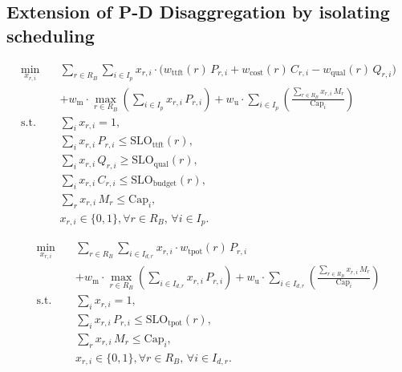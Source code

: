 \documentclass[letterpaper, anonymous, twocolumn, 10pt]{article}
\begin{document}
{\subsection{Extension of P-D Disaggregation by isolating scheduling}

\begin{equation}
\begin{aligned}
\min_{x_{r,i}} \quad 
& \sum_{r\in R_B}\sum_{i\in I_{p}} x_{r,i} \cdot \Big(w_{\text{ttft}}(r) \, P_{r,i} + w_{\text{cost}}(r) \, C_{r,i} - w_{\text{qual}}(r) \, Q_{r,i} \Big) \nonumber \\ 
& + w_{\text{m}} \cdot \max_{r \in R_B} \left( \sum_{i \in I_{p}} x_{r,i} \, P_{r,i} \right) \nonumber + w_{\text{u}} \cdot \sum_{i\in I_{p}}\left( \frac{\sum_{r\in R_B} x_{r,i} \, M_r}{\mathrm{Cap}_i}\right) \\
\text{s.t.}\quad 
& \sum_{i} x_{r,i} = 1, \\
& \sum_{i} x_{r,i} \, P_{r,i} \le \mathrm{SLO}_{\text{ttft}}(r), \\
& \sum_{i} x_{r,i} \, Q_{r,i} \ge \mathrm{SLO}_{\text{qual}}(r), \\
& \sum_{i} x_{r,i} \, C_{r,i} \le \mathrm{SLO}_{\text{budget}}(r), \\
& \sum_{r} x_{r,i} \, M_r \le \mathrm{Cap}_i, \\
& x_{r,i} \in \{0,1\}, \forall r \in R_B, \, \forall i \in I_{p}.
\end{aligned}
\end{equation}

\begin{equation}
\begin{aligned}
\min_{x_{r,i}} \quad 
& \sum_{r\in R_B}\sum_{i\in I_{d,r}} x_{r,i} \cdot w_{\text{tpot}}(r) \, P_{r,i}   \nonumber \\ 
& + w_{\text{m}} \cdot \max_{r \in R_B} \left( \sum_{i \in I_{d, r}} x_{r,i} \, P_{r,i} \right) \nonumber + w_{\text{u}} \cdot \sum_{i \in I_{d,r}}\left( \frac{\sum_{r\in R_B} x_{r,i} \, M_r}{\mathrm{Cap}_i}\right) \\
\text{s.t.}\quad 
& \sum_{i} x_{r,i} = 1, \\
& \sum_{i} x_{r,i} \, P_{r,i} \le \mathrm{SLO}_{\text{tpot}}(r), \\
& \sum_{r} x_{r,i} \, M_r \le \mathrm{Cap}_i, \\
& x_{r,i} \in \{0,1\}, \forall r \in R_B, \, \forall i \in I_{d, r}.
\end{aligned}
\end{equation}


}
\end{document}
